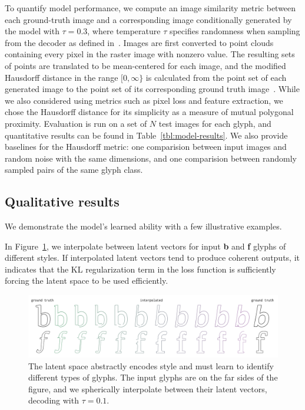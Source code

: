 To quantify model performance, we compute an image similarity metric between each ground-truth image and a corresponding image conditionally generated by the model with $\tau = 0.3$, where temperature $\tau$ specifies randomness when sampling from the decoder as defined in~\cite{ha2017neural}.
Images are first converted to point clouds containing every pixel in the raster image with nonzero value.
The resulting sets of points are translated to be mean-centered for each image, and the modified Hausdorff distance in the range $[0, \infty\}$ is calculated from the point set of each generated image to the point set of its corresponding ground truth image~\cite{dubuisson1994modified}.
While we also considered using metrics such as pixel loss and feature extraction, we chose the Hausdorff distance for its simplicity as a measure of mutual polygonal proximity.
Evaluation is run on a set of $N$ test images for each glyph, and quantitative results can be found in Table~\ref{tbl:model-results}.
We also provide baselines for the Hausdorff metric: one comparision between input images and random noise with the same dimensions, and one comparision between randomly sampled pairs of the same glyph class.

\subsection{Qualitative results}
We demonstrate the model's learned ability with a few illustrative examples.

In Figure~\ref{fig:interp}, we interpolate between latent vectors for input \textbf{b} and \textbf{f} glyphs of different styles.
If interpolated latent vectors tend to produce coherent outputs, it indicates that the KL regularization term in the loss function is sufficiently forcing the latent space to be used efficiently.
\begin{figure}[h]
    \centering
	\includegraphics[width=\textwidth]{figures/interp}
    \caption[Latent space interpolation for the single-class model]
    {The latent space abstractly encodes style and must learn to identify different types of glyphs.
    The input glyphs are on the far sides of the figure, and we spherically interpolate between their latent vectors, decoding with $\tau=0.1$.\label{fig:interp}}
\end{figure}

